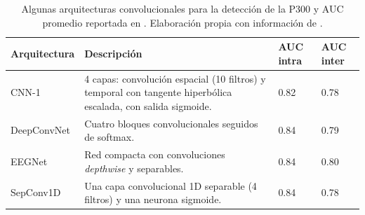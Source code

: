 \begin{table}[htbp]
\centering
\small
\begin{tabularx}{\textwidth}{|L{2.8cm}|Y|L{1.3cm}|L{1.3cm}|}
\hline
\textbf{Arquitectura} & \textbf{Descripción} & \textbf{AUC intra} & \textbf{AUC inter} \\ \hline
CNN-1 \cite{cecotti2011} & 4 capas: convolución espacial (10 filtros) y temporal con tangente hiperbólica escalada, con salida sigmoide. & 0.82 & 0.78 \\ \hline
DeepConvNet \cite{schirrmeister2017} & Cuatro bloques convolucionales seguidos de softmax. & 0.84 & 0.79 \\ \hline
EEGNet \cite{lawhern2018} & Red compacta con convoluciones \textit{depthwise} y separables. & 0.84 & 0.80 \\ \hline
SepConv1D \cite{alvarado2021} & Una capa convolucional 1D separable (4 filtros) y una neurona sigmoide. & 0.84 & 0.78 \\ \hline
\end{tabularx}
\caption{Algunas arquitecturas convolucionales para la detección de la P300 y AUC promedio reportada en \cite{alvarado2021}. Elaboración propia con información de \cite{alvarado2021,contreras2021}.}
\label{tab:arquitecturas}
\end{table}

